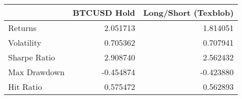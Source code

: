 \begin{tabular}{lrr}
\toprule
{} &  BTCUSD Hold &  Long/Short (Texblob) \\
\midrule
Returns      &     2.051713 &              1.814051 \\
Volatility   &     0.705362 &              0.707941 \\
Sharpe Ratio &     2.908740 &              2.562432 \\
Max Drawdown &    -0.454874 &             -0.423880 \\
Hit Ratio    &     0.575472 &              0.562893 \\
\bottomrule
\end{tabular}
